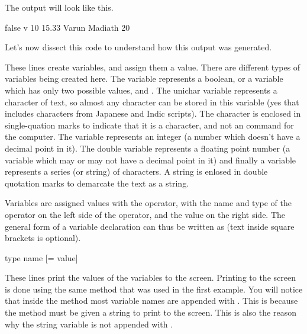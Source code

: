The output will look like this.

\begin{bashcommands}
false
v
10
15.33
Varun Madiath
20
\end{bashcommands}

Let's now dissect this code to understand how this output was generated.


These lines create variables, and assign them a value. There are different types of variables being created here. The  variable represents a boolean, or a variable which has only two possible values,  and . The unichar variable represents a character of text, so almost any character can be stored in this variable (yes that includes characters from Japanese and Indic scripts). The character is enclosed in single-quation marks to indicate that it is a character, and not an command for the computer. The  variable represents an integer (a number which doesn't have a decimal point in it). The double variable represents a floating point number (a variable which may or may not have a decimal point in it) and finally a  variable represents a series (or string) of characters. A string is enlosed in double quotation marks to demarcate the text as a string.

Variables are assigned values with the \inlinecode{=} operator, with the name and type of the operator on the left side of the operator, and the value on the right side. The general form of a variable declaration can thus be written as (text inside square brackets is optional).

\begin{bashcommands}
type name [= value]
\end{bashcommands}


These lines print the values of the variables to the screen. Printing to the screen is done using the same  method that was used in the first example. You will notice that inside the  method most variable names are appended with . This is because the  method must be given a string to print to the screen. This is also the reason why the string variable is not appended with .

